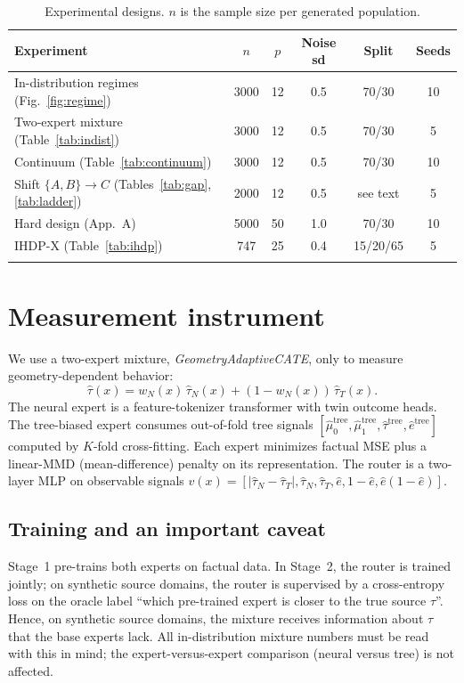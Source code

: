 \documentclass[pdflatex,sn-mathphys-num]{sn-jnl}
\begin{document}
\begin{table}[htbp]
\centering
\caption{Experimental designs. $n$ is the sample size per generated population.}
\label{tab:design}
\begin{tabular}{@{}lccccc@{}}
\toprule
Experiment & $n$ & $p$ & Noise sd & Split & Seeds\\
\midrule
In-distribution regimes (Fig.~\ref{fig:regime}) & 3000 & 12 & 0.5 & 70/30 & 10\\
Two-expert mixture (Table~\ref{tab:indist}) & 3000 & 12 & 0.5 & 70/30 & 5\\
Continuum (Table~\ref{tab:continuum}) & 3000 & 12 & 0.5 & 70/30 & 10\\
Shift $\{A,B\}\to C$ (Tables~\ref{tab:gap}, \ref{tab:ladder}) & 2000 & 12 & 0.5 & see text & 5\\
Hard design (App.~A) & 5000 & 50 & 1.0 & 70/30 & 10\\
IHDP-X (Table~\ref{tab:ihdp}) & 747 & 25 & 0.4 & 15/20/65 & 5\\
\botrule
\end{tabular}
\end{table}

\section{Measurement instrument}
\label{sec:instrument}

We use a two-expert mixture, \emph{GeometryAdaptiveCATE}, only to measure geometry-dependent behavior:
\begin{equation}
\hat\tau(x)=w_N(x)\,\hat\tau_N(x)+(1-w_N(x))\,\hat\tau_T(x).
\end{equation}
The neural expert is a feature-tokenizer transformer with twin outcome heads. The tree-biased expert consumes out-of-fold tree signals $[\hat\mu_0^{\mathrm{tree}}, \hat\mu_1^{\mathrm{tree}}, \hat\tau^{\mathrm{tree}}, \hat{e}^{\mathrm{tree}}]$ computed by $K$-fold cross-fitting. Each expert minimizes factual MSE plus a linear-MMD (mean-difference) penalty on its representation. The router is a two-layer MLP on observable signals $v(x)=[|\hat\tau_N-\hat\tau_T|, \hat\tau_N, \hat\tau_T, \hat{e}, 1-\hat{e}, \hat{e}(1-\hat{e})]$.

\subsection*{Training and an important caveat}
Stage~1 pre-trains both experts on factual data. In Stage~2, the router is trained jointly; on synthetic source domains, the router is supervised by a cross-entropy loss on the oracle label ``which pre-trained expert is closer to the true source $\tau$''. Hence, on synthetic source domains, the mixture receives information about $\tau$ that the base experts lack. All in-distribution mixture numbers must be read with this in mind; the expert-versus-expert comparison (neural versus tree) is not affected.
\end{document}
